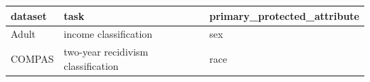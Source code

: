 \begin{tabular}{lll}
\toprule
dataset & task & primary\_protected\_attribute \\
\midrule
Adult & income classification & sex \\
COMPAS & two-year recidivism classification & race \\
\bottomrule
\end{tabular}

